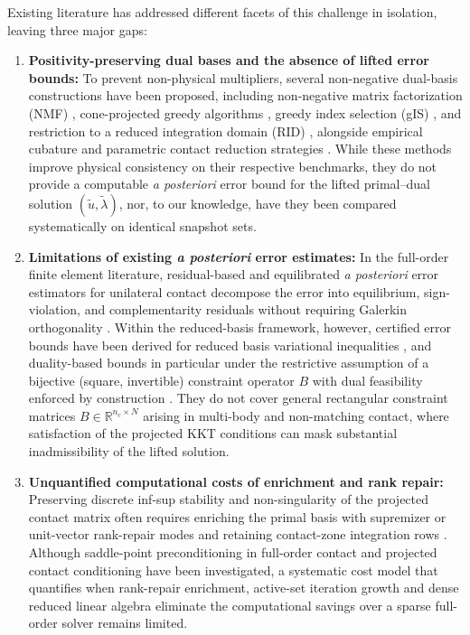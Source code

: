 \documentclass[11pt,a4paper]{article}
\begin{document}
Existing literature has addressed different facets of this challenge in isolation, leaving three major gaps:
\begin{enumerate}
    \item \textbf{Positivity-preserving dual bases and the absence of lifted error bounds:} To prevent non-physical multipliers, several non-negative dual-basis constructions have been proposed, including non-negative matrix factorization (NMF) \cite{lee1999learning, balajewicz2016projection}, cone-projected greedy algorithms \cite{benaceur2020reduced}, greedy index selection (gIS) \cite{sambataro2026model}, and restriction to a reduced integration domain (RID) \cite{fauque2018hybrid, leberre2022condition}, alongside empirical cubature and parametric contact reduction strategies \cite{farhat2014dimensional, hernandez2017dimensional, koller2021hyper, aresdeparga2023petrov, kollepara2024sparse, pawar2025efficient}. While these methods improve physical consistency on their respective benchmarks, they do not provide a computable \emph{a posteriori} error bound for the lifted primal--dual solution $(\tilde{u}, \tilde{\lambda})$, nor, to our knowledge, have they been compared systematically on identical snapshot sets.
    \item \textbf{Limitations of existing \emph{a posteriori} error estimates:} In the full-order finite element literature, residual-based and equilibrated \emph{a posteriori} error estimators for unilateral contact decompose the error into equilibrium, sign-violation, and complementarity residuals without requiring Galerkin orthogonality \cite{veeser2001efficient, coorevits2000posteriori, hild2007residual, braess2007convergence, wohlmuth2007posteriori, weiss2009posteriori, dabaghi2020posteriori, banz2024generic, fontana2024guaranteed, banz2026posteriori}. Within the reduced-basis framework, however, certified error bounds have been derived for reduced basis variational inequalities \cite{haasdonk2012reduced, bader2016empirical, zhang2016slack}, and duality-based bounds in particular under the restrictive assumption of a bijective (square, invertible) constraint operator $B$ with dual feasibility enforced by construction \cite{zhang2014duality}. They do not cover general rectangular constraint matrices $B \in \mathbb{R}^{n_c \times N}$ arising in multi-body and non-matching contact, where satisfaction of the projected KKT conditions can mask substantial inadmissibility of the lifted solution.
    \item \textbf{Unquantified computational costs of enrichment and rank repair:} Preserving discrete inf-sup stability and non-singularity of the projected contact matrix often requires enriching the primal basis with supremizer or unit-vector rank-repair modes and retaining contact-zone integration rows \cite{fauque2018hybrid, leberre2022condition, rozza2013reduced}. Although saddle-point preconditioning in full-order contact \cite{franceschini2022block} and projected contact conditioning \cite{leberre2022condition} have been investigated, a systematic cost model that quantifies when rank-repair enrichment, active-set iteration growth and dense reduced linear algebra eliminate the computational savings over a sparse full-order solver remains limited.
\end{enumerate}
\end{document}
